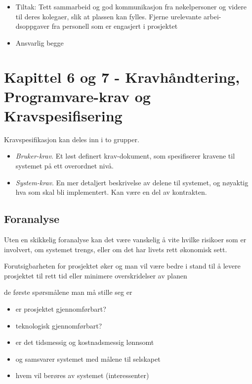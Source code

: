 \documentclass[11pt]{article}
\begin{document}
\begin{itemize}
\begin{enumerate}
\begin{itemize}
\item Tiltak:
          Tett sammarbeid og god kommunikasjon fra nøkelpersoner og videre
          til deres kolegaer, slik at plassen kan fylles. Fjerne urelevante arbei-
          dsoppgaver fra personell som er engasjert i prosjektet
\item Ansvarlig
          begge
\end{itemize}

\end{enumerate}

\end{itemize} %
\section{Kapittel 6 og 7 - Kravhåndtering, Programvare-krav og Kravspesifisering}
\label{sec-6}

  Kravspesifikasjon kan deles inn i to grupper.
\begin{itemize}
\item \emph{Bruker-krav}. 
    Et løst definert krav-dokument, som spesifiserer kravene til systemet på ett overordnet nivå.
\item \emph{System-krav}. 
    En mer detaljert beskrivelse av delene til systemet, og nøyaktig 
    hva som skal bli implementert. Kan være en del av kontrakten.
\end{itemize}
\subsection{Foranalyse}
\label{sec-6.1}

              
   Uten en skikkelig foranalyse kan det være vanskelig
   å vite hvilke risikoer som er involvert, om systemet
   trengs, eller om det har livets rett økonomisk sett.
   
   Forutsigbarheten for prosjektet øker og man vil være
   bedre i stand til å levere prosjektet til rett tid eller
   minimere overskridelser av planen

   de første spørsmålene man må stille seg er
\begin{itemize}
\item er prosjektet gjennomførbart?
\item teknologisk gjennomførbart?
\item er det tidsmessig og kostnadsmessig lønnsomt
\item og samsvarer systemet med målene til selskapet
\item hvem vil berøres av systemet (interessenter)
\end{itemize}
\end{document}
